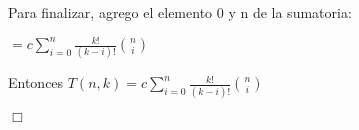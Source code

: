Para finalizar, agrego el elemento 0 y n de la sumatoria:

$ = c  \sum_{i=0}^{n} \frac{k!}{(k-i)!}\binom{n}{i}$ 

Entonces $T(n,k)  = c  \sum_{i=0}^{n} \frac{k!}{(k-i)!}\binom{n}{i}$ 

\begin{flushright}
    \hfill \ensuremath{\Box}
    \end{flushright}






% 
% 
% 
% 
% 
